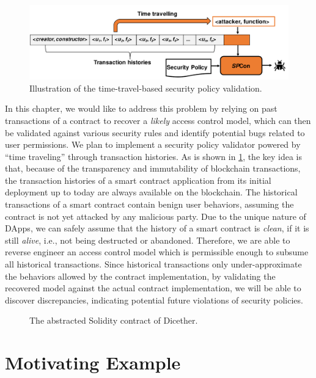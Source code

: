\begin{figure}[t]
	\centering
	\includegraphics[width=\linewidth]{Figures/Chapter4/SPconIllustration-crop.pdf}
	\caption{Illustration of the time-travel-based security policy validation.}
	\label{fig:time-travel}
\end{figure}

In this chapter, we would like to address this problem by relying on past transactions of a contract
to recover a \emph{likely} access control model, which can then be validated against various
security rules and identify potential bugs related to user permissions.
We plan to implement a security policy validator powered by ``time traveling'' through transaction
histories.
As is shown in \cref{fig:time-travel}, the key idea is that, because of the transparency and
immutability of blockchain transactions, the transaction histories of a smart contract application
from its initial deployment up to today are always available on the blockchain.
The historical transactions of a smart contract contain benign user behaviors, assuming the
contract is not yet attacked by any malicious party.
Due to the unique nature of DApps, we can safely assume that the history of a smart contract is
\emph{clean}, if it is still \emph{alive}, i.e., not being destructed or abandoned.
Therefore, we are able to reverse engineer an access control model which is permissible enough to
subsume all historical transactions.
Since historical transactions only under-approximate the behaviors allowed by the contract
implementation, by validating the recovered model against the actual contract implementation, we
will be able to discover discrepancies, indicating potential future violations of security policies.

\begin{figure}[!t]
	\centering
	\scalebox{0.6}{
		
	}
	\caption{The abstracted Solidity contract of Dicether.}
	\label{fig:Dicether}
\end{figure}

\section{Motivating Example}
\label{sec:motivationExample}

